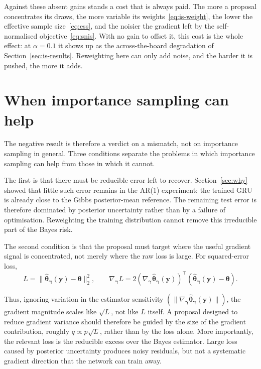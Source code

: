 Against these absent gains stands a cost that is always paid. The more a
proposal concentrates its draws, the more variable its
weights~\eqref{eq:is-weight}, the lower the effective sample
size~\eqref{eq:ess}, and the noisier the gradient left by the
self-normalised objective~\eqref{eq:snis}. With no gain to offset it, this
cost is the whole effect: at $\alpha = 0.1$ it shows up as the
across-the-board degradation of Section~\ref{sec:is-results}. Reweighting
here can only add noise, and the harder it is pushed, the more it adds.


\section{When importance sampling can help}
\label{sec:when}


The negative result is therefore a verdict on a mismatch, not on importance sampling in general. Three conditions separate the problems in which importance sampling can help from those in which it cannot.

The first is that there must be reducible error left to recover. Section~\ref{sec:why} showed that little such error remains in the AR(1) experiment: the trained GRU is already close to the Gibbs posterior-mean reference. The remaining test error is therefore dominated by posterior uncertainty rather than by a failure of optimisation. Reweighting the training distribution cannot remove this irreducible part of the Bayes risk.

The second condition is that the proposal must target where the useful gradient signal is concentrated, not merely where the raw loss is large. For squared-error loss,
\[
L = \|\hat{\bm{\theta}}_{\bm{\gamma}}(\mathbf{y})-\bm{\theta}\|_2^2,
\qquad
\nabla_{\bm{\gamma}} L = 2\left(\nabla_{\bm{\gamma}}\hat{\bm{\theta}}_{\bm{\gamma}}(\mathbf{y})\right)^{\!\top}\left(\hat{\bm{\theta}}_{\bm{\gamma}}(\mathbf{y})-\bm{\theta}\right).
\]

Thus, ignoring variation in the estimator sensitivity $(\|\nabla_{\bm{\gamma}}\hat{\bm{\theta}}_{\bm{\gamma}}(\mathbf{y})\|)$, the gradient magnitude scales like $\sqrt{L}$, not like $L$ itself. A proposal designed to reduce gradient variance should therefore be guided by the size of the gradient contribution, roughly $q \propto p\sqrt{L}$, rather than by the loss alone. More importantly, the relevant loss is the reducible excess over the Bayes estimator. Large loss caused by posterior uncertainty produces noisy residuals, but not a systematic gradient direction that the network can train away.

